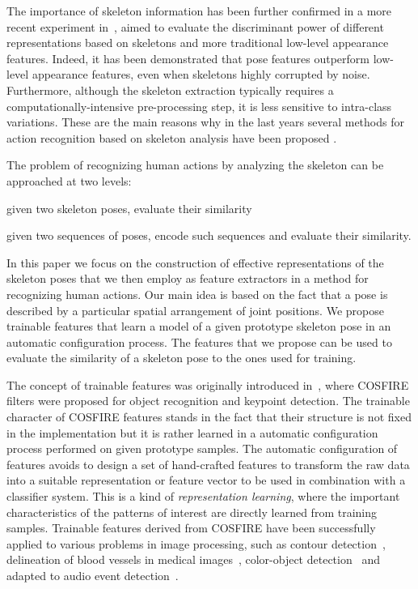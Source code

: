 \documentclass[runningheads,a4paper]{llncs}
\begin{document}
The importance of skeleton information has been further confirmed in a more recent experiment in~\cite{Yao11}, aimed to evaluate the discriminant power of different representations based on skeletons and more traditional low-level appearance features. Indeed, it has been demonstrated that pose features outperform low-level appearance features, even when skeletons highly corrupted by noise.
Furthermore, although the skeleton extraction typically requires a computationally-intensive pre-processing step, it is less sensitive to intra-class variations.
These are the main reasons why in the last years several methods for action recognition based on skeleton analysis have been proposed \cite{Vemulapalli14,Chaudhry13,Yang14,Dias16,Dias16_2}.


The problem of recognizing human actions by analyzing the skeleton can be approached at two levels: 
\begin{inparaenum}
\item given two skeleton poses, evaluate their similarity
\item given two sequences of poses, encode such sequences and evaluate their similarity.
\end{inparaenum}

In this paper we focus on the construction of  effective representations of the skeleton poses that we then employ as feature extractors in a method for recognizing human actions. Our main idea is based on the fact that a pose is described by a particular spatial arrangement of joint positions. We propose trainable features that learn a model of a given prototype skeleton pose in an automatic configuration process. The features that we propose can be used to evaluate the similarity of a skeleton pose to the ones used for training.

The concept of trainable features was originally introduced in~\cite{Azzopardi13}, where COSFIRE filters were proposed for object recognition and keypoint detection. 
The trainable character of COSFIRE features stands in the fact that their structure is not fixed in the implementation but it is rather learned in a automatic configuration process performed on given prototype samples.  
The automatic configuration of features avoids to design a set of hand-crafted features to transform the raw data into a suitable representation or feature vector to be used in combination with a classifier system.
This is a kind of \emph{representation learning}, where the important characteristics of the patterns of interest are directly learned from training samples. 
Trainable features derived from COSFIRE have been successfully applied to various problems in image processing, such as contour detection~\cite{AzzopardiPetkovCORF2012}, delineation of blood vessels in medical images~\cite{AzzopardiMEDIA2015,StrisciuglioVIP15}, color-object detection~\cite{Gecer2017} and adapted to audio event detection~\cite{StrisciuglioCOPE2016}.	
\end{document}
